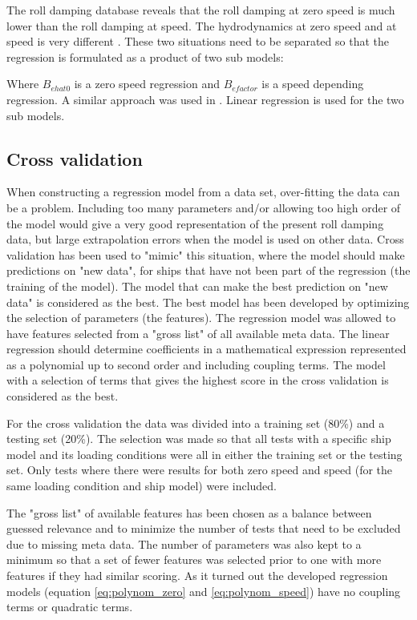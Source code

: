 The roll damping database reveals that the roll damping at zero speed is much lower than the roll damping at speed. The hydrodynamics at zero speed and at speed is very  different \parencite{ikeda_velocity_1979}. These two situations need to be separated so that  the regression is formulated  as a product of two sub models:

Where $B_{ehat0}$ is a zero speed regression and $B_{efactor}$ is a speed depending regression. A similar approach was used in \parencite{henry_peter_piehl_ship_2016}. Linear regression is  used for the two sub models. 

\subsection{Cross validation}
When constructing a regression model from a data set, over-fitting the data can be a problem. Including too many parameters and/or allowing too high order of the model would give a very good representation of the present roll damping data, but large extrapolation errors when the model is used on other data. Cross validation has been used to "mimic" this situation, where the model should make predictions on "new data", for ships that have not been part of the regression (the training of the model). The model that can make the best prediction on "new data" is considered as the best. The best model has been developed by optimizing the selection of parameters (the features). The regression model was allowed to have features selected from a "gross list" of all available meta data. The linear regression should determine coefficients in a mathematical expression represented as a polynomial up to second order and including coupling terms. The model with a selection of terms that gives the highest score in the cross validation is considered as the best.    

For the cross validation the data was divided into a  training set (80\%) and a testing set (20\%). The selection was made so that all tests with a specific ship model and its loading conditions were all in either the training set or the testing set. Only tests where there were results for both zero speed and speed (for the same loading condition and ship model) were included.

The "gross list" of available features has been chosen as a balance between guessed relevance and to minimize the number of tests that need to be excluded due to missing meta data. 
The number of parameters was also kept to a minimum so that a set of fewer features was selected prior to one with more features if they had similar scoring. As it turned out the developed regression models (equation \ref{eq:polynom_zero} and \ref{eq:polynom_speed}) have no coupling terms or quadratic terms.

